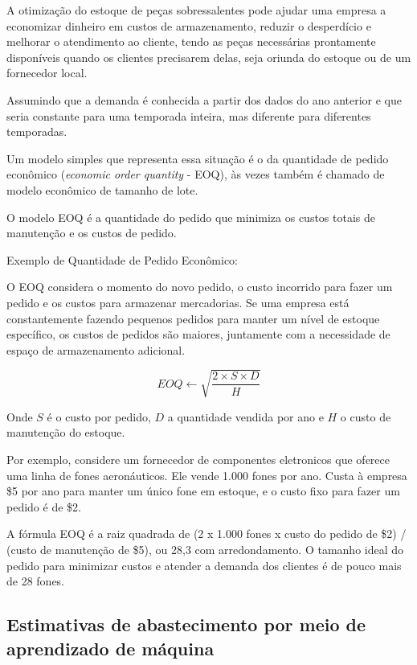 \documentclass{article}
\begin{document}
A otimização do estoque de peças sobressalentes pode ajudar uma empresa a economizar dinheiro em custos de armazenamento, reduzir o desperdício e melhorar o atendimento ao cliente, tendo as peças necessárias prontamente disponíveis quando os clientes precisarem delas, seja oriunda do estoque ou de um fornecedor local.

Assumindo que a demanda é conhecida a partir dos dados do ano anterior e que seria constante para uma temporada inteira, mas diferente para diferentes temporadas.

Um modelo simples que representa essa situação é o da quantidade de pedido econômico ({\it economic order quantity} - EOQ), às vezes também é chamado de modelo econômico de tamanho de lote.

O modelo EOQ é a quantidade do pedido que minimiza os custos totais de manutenção e os custos de pedido.

Exemplo de Quantidade de Pedido Econômico:

O EOQ considera o momento do novo pedido, o custo incorrido para fazer um pedido e os custos para armazenar mercadorias. Se uma empresa está constantemente fazendo pequenos pedidos para manter um nível de estoque específico, os custos de pedidos são maiores, juntamente com a necessidade de espaço de armazenamento adicional.

\begin{equation} \label{eq:eoq}
	EOQ \gets \sqrt{\frac{2 \times S \times D}{H}}
\end{equation}

Onde $S$ é o custo por pedido, $D$ a quantidade vendida por ano e $H$ o custo de manutenção do estoque.

Por exemplo, considere um fornecedor de componentes eletronicos que oferece uma linha de fones aeronáuticos. Ele vende 1.000 fones por ano. Custa à empresa \$5 por ano para manter um único fone em estoque, e o custo fixo para fazer um pedido é de \$2.

A fórmula EOQ é a raiz quadrada de (2 x 1.000 fones x custo do pedido de \$2) / (custo de manutenção de \$5), ou 28,3 com arredondamento. O tamanho ideal do pedido para minimizar custos e atender a demanda dos clientes é de pouco mais de 28 fones.

\subsection{Estimativas de abastecimento por meio de aprendizado de máquina}
\end{document}
